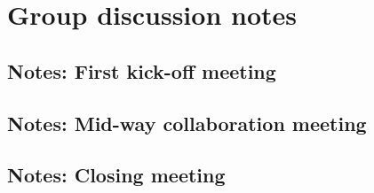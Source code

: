 \chapter{Group discussion notes}
\label{appendix2-group-discussion-notes}

\section*{Notes: First kick-off meeting}

\section*{Notes: Mid-way collaboration meeting}

\section*{Notes: Closing meeting}
